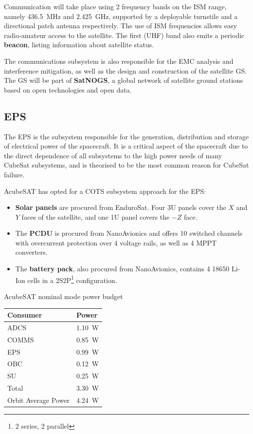 \documentclass[a4paper,nobib]{tufte-book}
\begin{document}
Communication will take place using 2 frequency bands on the \acs{ISM} range, namely \SI{436.5}{\mega\hertz} and \SI{2.425}{\giga\hertz}, supported by a deployable turnstile and a directional patch antenna respectively. The use of \acs{ISM} frequencies allows easy radio-amateur access to the satellite. The first (\acs{UHF}) band also emits a periodic \textbf{beacon}, listing information about satellite status.

The communications subsystem is also responsible for the \ac{EMC} analysis and interference mitigation, as well as the design and construction of the satellite \acl{GS}. The \acl{GS} will be part of \textbf{SatNOGS}\autocite{white_overview_satellite_2018}, a global network of satellite ground stations based on open technologies and open data.

\subsection{\acf{EPS}}
The \ac{EPS} is the subsystem responsible for the generation, distribution and storage of electrical power of the spacecraft. It is a critical aspect of the spacecraft due to the direct dependence of all subsystems to the high power needs of many CubeSat subsystems, and is theorised to be the most common reason for CubeSat failure.\autocite{langer_reliability_cubesats_2016}

AcubeSAT has opted for a \ac{COTS} subsystem approach for the \ac{EPS}:\autocite{DDJF_SYS}
\begin{itemize}
	\item \textbf{Solar panels} are procured from EnduroSat. Four 3U panels cover the \(X\) and \(Y\) faces of the satellite, and one 1U panel covers the \(-Z\) face.
	\item The \textbf{\ac{PCDU}} is procured from NanoAvionics and offers 10 switched channels with overcurrent protection over 4 voltage rails, as well as 4 \ac{MPPT} converters.
	\item The \textbf{battery pack}, also procured from NanoAvionics, contains 4 18650 Li-Ion cells in a 2S2P\footnote{2 series, 2 parallel} configuration.
\end{itemize}

\begin{margintable}
	\caption{AcubeSAT nominal mode power budget}
	\label{tab:power_budget}
	\begin{tabularx}{\linewidth}{@{}lX@{}}
		\toprule
		\textbf{Consumer}            & \textbf{Power}            \\ \midrule
		\acs{ADCS}          & \SI{1.10}{\watt} \\
		\acs{COMMS}         & \SI{0.85}{\watt} \\
		\acs{EPS}           & \SI{0.99}{\watt} \\
		\acs{OBC}           & \SI{0.12}{\watt} \\
		\acs{SU}            & \SI{0.25}{\watt} \\ \midrule
		Total               & \SI{3.30}{\watt} \\
		Orbit Average Power & \SI{4.24}{\watt} \\ \bottomrule
	\end{tabularx}
\end{margintable}
\end{document}

